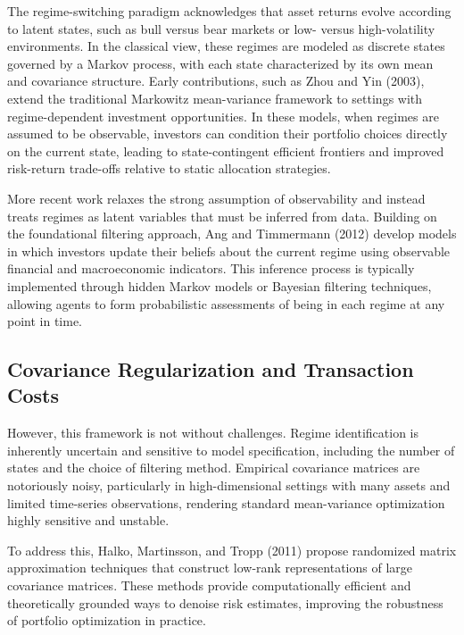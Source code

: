 \documentclass[12pt]{article}
\begin{document}
The regime-switching paradigm acknowledges that asset returns evolve according to latent states, such as bull versus bear markets or low- versus high-volatility environments. In the classical view, these regimes are modeled as discrete states governed by a Markov process, with each state characterized by its own mean and covariance structure. Early contributions, such as Zhou and Yin (2003), extend the traditional Markowitz mean-variance framework to settings with regime-dependent investment opportunities. In these models, when regimes are assumed to be observable, investors can condition their portfolio choices directly on the current state, leading to state-contingent efficient frontiers and improved risk-return trade-offs relative to static allocation strategies.

More recent work relaxes the strong assumption of observability and instead treats regimes as latent variables that must be inferred from data. Building on the foundational filtering approach, Ang and Timmermann (2012) develop models in which investors update their beliefs about the current regime using observable financial and macroeconomic indicators. This inference process is typically implemented through hidden Markov models or Bayesian filtering techniques, allowing agents to form probabilistic assessments of being in each regime at any point in time.


\subsection{Covariance Regularization and Transaction Costs}

However, this framework is not without challenges. Regime identification is inherently uncertain and sensitive to model specification, including the number of states and the choice of filtering method. Empirical covariance matrices are notoriously noisy, particularly in high-dimensional settings with many assets and limited time-series observations, rendering standard mean-variance optimization highly sensitive and unstable. 

To address this, Halko, Martinsson, and Tropp (2011) propose randomized matrix approximation techniques that construct low-rank representations of large covariance matrices. These methods provide computationally efficient and theoretically grounded ways to denoise risk estimates, improving the robustness of portfolio optimization in practice.
\end{document}

